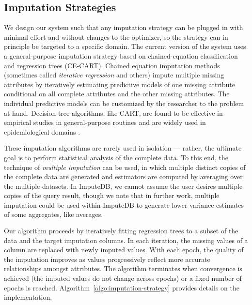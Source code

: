 \begin{algorithm}

\end{algorithm}

\begin{algorithm}

\end{algorithm}

\begin{algorithm}

\end{algorithm}

\subsection{Imputation Strategies}

We design our system such that any imputation strategy can be plugged in with minimal effort
and without changes to the optimizer, so the strategy can in principle be targeted to a
specific domain. The current version of the system uses a general-purpose imputation
strategy based on chained-equation classification and regression trees (CE-CART). Chained
equation imputation methods \cite{vanbuuren2011mice} (sometimes called \textit{iterative
regression} \cite{gelman2006data} and others) impute multiple missing attributes by
iteratively estimating predictive models of one missing attribute conditional on all
complete attributes and the other missing attributes. The individual predictive models can
be customized by the researcher to the problem at hand. Decision tree algorithms, like CART,
are found to be effective \cite{akande2015empirical} in empirical studies in general-purpose
routines and are widely used in epidemiological domains \cite{burgette2010multiple}.  

These imputation algorithms are rarely used in isolation --- rather, the ultimate goal is to
perform statistical analysis of the complete data. To this end, the technique of
\textit{multiple imputation} can be used, in which multiple distinct copies of the complete
data are generated and estimators are computed by averaging over the multiple datasets. In
ImputeDB, we cannot assume the user desires multiple copies of the query result, though we
note that in further work, multiple imputation could be used within ImputeDB to generate
lower-variance estimates of some aggregates, like averages.

Our algorithm proceeds by iteratively fitting regression trees to a subset of the data and
the target imputation columns. In each iteration, the missing values of a column are
replaced with newly imputed values. With each epoch, the quality of the imputation improves
as values progressively reflect more accurate relationships amongst attributes. The
algorithm terminates when convergence is achieved (the imputed values do not change across
epochs) or a fixed number of epochs is reached.  Algorithm~\ref{algo:imputation-strategy}
provides details on the implementation.  

